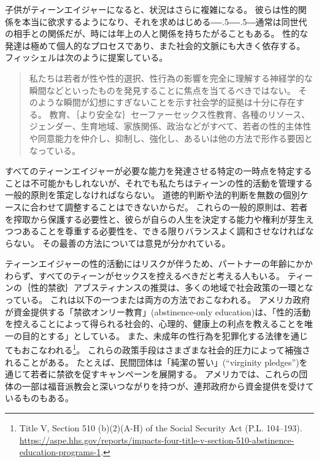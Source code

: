 \documentclass[paper=a4,book,openany]{jlreq}
\def\DDASH{―\kern-.5\zw―\kern-.5\zw―} %
\begin{document}
子供がティーンエイジャーになると、状況はさらに複雑になる。
彼らは性的関係を本当に欲求するようになり、それを求めはじめる{\DDASH}通常は同世代の相手との関係だが、時には年上の人と関係を持ちたがることもある。
性的な発達は極めて個人的なプロセスであり、また社会的文脈にも大きく依存する。
フィッシェルは次のように提案している。

\begin{quote}
私たちは若者が性や性的選択、性行為の影響を完全に理解する神経学的な瞬間などといったものを発見することに焦点を当てるべきではない。
そのような瞬間が幻想にすぎないことを示す社会学的証拠は十分に存在する。
教育、｛より安全な｝{セーファー}セックス性教育、各種のリソース、ジェンダー、生育地域、家族関係、政治などがすべて、若者の性的主体性や同意能力を仲介し、抑制し、強化し、あるいは他の方法で形作る要因となっている。
\citep[p.305]{fischel10:_per_se_power}
\end{quote}

すべてのティーンエイジャーが必要な能力を発達させる特定の一時点を特定することは不可能かもしれないが、それでも私たちはティーンの性的活動を管理する一般的原則を策定しなければならない。
道徳的判断や法的判断を無数の個別ケースに合わせて調整することはできないからだ。
これらの一般的原則は、若者を搾取から保護する必要性と、彼らが自らの人生を決定する能力や権利が芽生えつつあることを尊重する必要性を、できる限りバランスよく調和させなければならない。
その最善の方法については意見が分かれている。

ティーンエイジャーの性的活動にはリスクが伴うため、パートナーの年齢にかかわらず、すべてのティーンがセックスを控えるべきだと考える人もいる。
ティーンの｛性的禁欲｝{アブスティナンス}の推奨は、多くの地域で社会政策の一環となっている。
これは以下の一つまたは両方の方法でおこなわれる。
アメリカ政府が資金提供する「禁欲オンリー教育」(abstinence-only education)は、「性的活動を控えることによって得られる社会的、心理的、健康上の利点を教えることを唯一の目的とする」としている。
また、未成年の性行為を犯罪化する法律を通じてもおこなわれる\footnote{Title V, Section 510 (b)(2)(A-H) of the Social Security Act (P.L. 104--193). \url{https://aspe.hhs.gov/reports/impacts-four-title-v-section-510-abstinence-education-programs-1}.}。
これらの政策手段はさまざまな社会的圧力によって補強されることがある。
たとえば、民間団体は「純潔の誓い」(``virginity pledges'')を通じて若者に禁欲を促すキャンペーンを展開する。
アメリカでは、これらの団体の一部は福音派教会と深いつながりを持つが、連邦政府から資金提供を受けているものもある。
\end{document}
